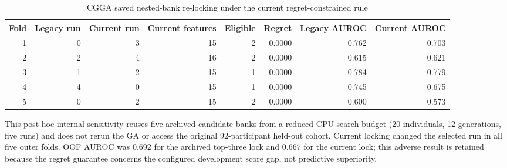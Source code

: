 \begin{table}[H]
\centering
\caption{CGGA saved nested-bank re-locking under the current regret-constrained rule}
\label{tab:supp17}
\scriptsize
\begin{tabular}{rrrrrrrr}
\toprule
Fold & Legacy run & Current run & Current features & Eligible & Regret & Legacy AUROC & Current AUROC \\
\midrule
1 & 0 & 3 & 15 & 2 & 0.0000 & 0.762 & 0.703 \\
2 & 2 & 4 & 16 & 2 & 0.0000 & 0.615 & 0.621 \\
3 & 1 & 2 & 15 & 1 & 0.0000 & 0.784 & 0.779 \\
4 & 4 & 0 & 15 & 1 & 0.0000 & 0.745 & 0.675 \\
5 & 0 & 2 & 15 & 2 & 0.0000 & 0.600 & 0.573 \\
\bottomrule
\end{tabular}
\begin{minipage}{0.98\linewidth}\scriptsize\vspace{0.3em}
This post hoc internal sensitivity reuses five archived candidate banks from a reduced CPU search budget (20 individuals, 12 generations, five runs) and does not rerun the GA or access the original 92-participant held-out cohort. Current locking changed the selected run in all five outer folds. OOF AUROC was 0.692 for the archived top-three lock and 0.667 for the current lock; this adverse result is retained because the regret guarantee concerns the configured development score gap, not predictive superiority.
\end{minipage}
\end{table}
